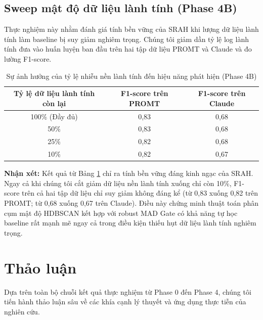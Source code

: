 \documentclass[../main.tex]{subfiles}
\begin{document}
\subsection{Sweep mật độ dữ liệu lành tính (Phase 4B)}
Thực nghiệm này nhằm đánh giá tính bền vững của SRAH khi lượng dữ liệu lành tính làm baseline bị suy giảm nghiêm trọng. Chúng tôi giảm dần tỷ lệ log lành tính đưa vào huấn luyện ban đầu trên hai tập dữ liệu PROMT và Claude và đo lường F1-score.

\begin{table}[H]
\centering
\begin{tabular}{|c|c|c|}
\hline
\textbf{Tỷ lệ dữ liệu lành tính còn lại} & \textbf{F1-score trên PROMT} & \textbf{F1-score trên Claude} \\ \hline
100\% (Đầy đủ) & 0,83 & 0,68 \\ \hline
50\% & 0,83 & 0,68 \\ \hline
25\% & 0,82 & 0,68 \\ \hline
10\% & 0,82 & 0,67 \\ \hline
\end{tabular}
\caption{Sự ảnh hưởng của tỷ lệ nhiễu nền lành tính đến hiệu năng phát hiện (Phase 4B)}
\label{table:benign_density_sweep}
\end{table}

\textbf{Nhận xét:}
Kết quả từ Bảng \ref{table:benign_density_sweep} chỉ ra tính bền vững đáng kinh ngạc của SRAH. Ngay cả khi chúng tôi cắt giảm dữ liệu nền lành tính xuống chỉ còn 10\%, F1-score trên cả hai tập dữ liệu chỉ suy giảm không đáng kể (từ 0,83 xuống 0,82 trên PROMT; từ 0,68 xuống 0,67 trên Claude). Điều này chứng minh thuật toán phân cụm mật độ HDBSCAN kết hợp với robust MAD Gate có khả năng tự học baseline rất mạnh mẽ ngay cả trong điều kiện thiếu hụt dữ liệu lành tính nghiêm trọng.

\section{Thảo luận}
\label{section:3.6}

Dựa trên toàn bộ chuỗi kết quả thực nghiệm từ Phase 0 đến Phase 4, chúng tôi tiến hành thảo luận sâu về các khía cạnh lý thuyết và ứng dụng thực tiễn của nghiên cứu.
\end{document}
